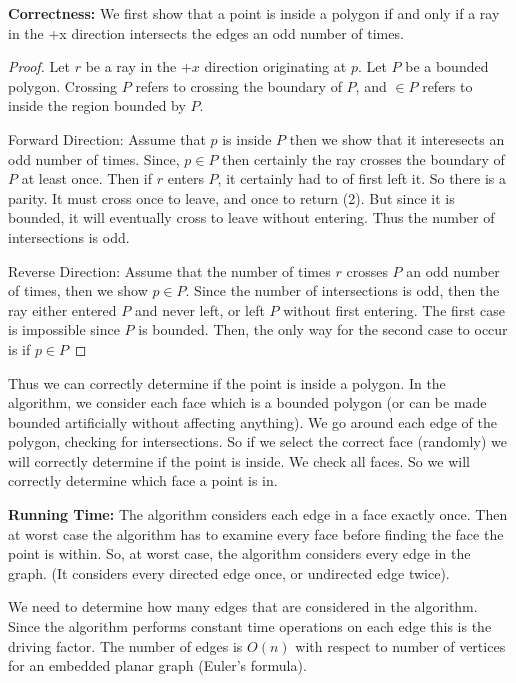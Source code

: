 \documentclass[11pt]{article}
\begin{document}
\textbf{Correctness: } We first show that a point is inside a polygon if and only if a ray in the +x direction 
intersects the edges an odd number of times. 

\begin{proof}
    
    Let $r$ be a ray in the $+x$ direction originating at $p$. Let $P$ be a bounded polygon. 
    Crossing $P$ refers to crossing the boundary of $P$, and $\in P$ refers to inside the region bounded by $P$.

    Forward Direction: Assume that $p$ is inside $P$ then we show that it interesects an odd number of times.
    Since, $p \in P$ then certainly the ray crosses the boundary of $P$ at least once. Then if $r$ enters $P$,
    it certainly had to of first left it. So there is a parity. It must cross once to leave, and once to return (2).
    But since it is bounded, it will eventually cross to leave without entering. Thus the number of intersections is odd.

    Reverse Direction: Assume that the number of times $r$ crosses $P$ an odd number of times, then we show $p \in P$.
    Since the number of intersections is odd, then the ray either entered $P$ and never left,
    or left $P$ without first entering. The first case is impossible since $P$ is bounded. 
    Then, the only way for the second case to occur is if $p \in P$
\end{proof}

Thus we can correctly determine if the point is inside a polygon. In the algorithm, we consider each face which is a bounded polygon (or can be made bounded artificially without affecting anything).
We go around each edge of the polygon, checking for intersections. So if we select the correct face (randomly) we will correctly
determine if the point is inside. We check all faces. So we will correctly determine which face a point is in.

\textbf{Running Time: } 
The algorithm considers each edge in a face exactly once. Then at worst case the algorithm has to examine
every face before finding the face the point is within. So, at worst case, the algorithm considers every edge in the graph.
(It considers every directed edge once, or undirected edge twice).

We need to determine how many edges that are considered in the algorithm.
Since the algorithm performs constant time operations on each edge this is the driving factor.
The number of edges is $O(n)$ with respect to number of vertices for an embedded planar graph (Euler's formula).
\end{document}
